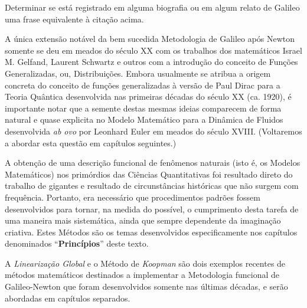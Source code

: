 \begin{exercise}
Determinar se está registrado em alguma biografia ou em algum relato de Galileo uma frase equivalente à citação acima.
\end{exercise}

    A única extensão notável da bem sucedida Metodologia de Galileo após Newton somente se deu em meados do século XX com os trabalhos dos matemáticos Israel M. Gelfand, Laurent Schwartz e outros com a introdução do conceito de Funções Generalizadas, ou, Distribuições. Embora usualmente se atribua a origem concreta do conceito de funções generalizadas à versão de Paul Dirac para a Teoria Quântica desenvolvida nas primeiras décadas do século XX (ca. 1920), é importante notar que a semente destas mesmas ideias comparecem de forma natural e quase explicita no Modelo Matemático para a Dinâmica de Fluidos desenvolvida \textit{ab ovo} por Leonhard Euler em meados do século XVIII. (Voltaremos a abordar esta questão em capítulos seguintes.)

    A obtenção de uma descrição funcional de fenômenos naturais (isto é, os Modelos Matemáticos) nos primórdios das Ciências Quantitativas foi resultado direto do trabalho de gigantes e resultado de circunstâncias históricas que não surgem com frequência. Portanto, era necessário que procedimentos padrões fossem desenvolvidos para tornar, na medida do possível, o cumprimento desta tarefa de uma maneira mais sistemática, ainda que sempre dependente da imaginação criativa. Estes Métodos são os temas desenvolvidos especificamente nos capítulos denominados ``\textbf{Princípios}'' deste texto.

    A \textit{Linearização Global} e o Método de \textit{Koopman} são dois exemplos recentes de métodos matemáticos destinados a implementar a Metodologia funcional de Galileo-Newton que foram desenvolvidos somente nas últimas décadas, e serão abordadas em capítulos separados.

